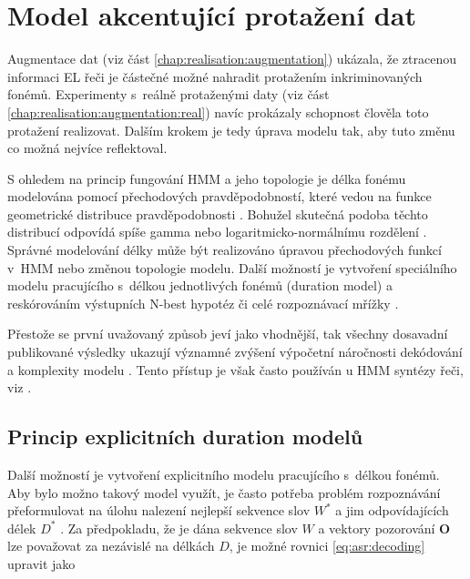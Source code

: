 \section{Model akcentující protažení dat}
\label{chap:realisation:durationmodels}

Augmentace dat (viz část \ref{chap:realisation:augmentation}) ukázala, že ztracenou informaci EL řeči je částečné možné nahradit protažením inkriminovaných fonémů.
Experimenty s~reálně protaženými daty (viz část \ref{chap:realisation:augmentation:real}) navíc prokázaly schopnost člověla toto protažení realizovat.
Dalším krokem je tedy úprava modelu tak, aby tuto změnu co možná nejvíce reflektoval.

S ohledem na princip fungování HMM a jeho topologie je délka fonému modelována pomocí přechodových pravděpodobností, které vedou na funkce geometrické distribuce pravděpodobnosti \cite{Rabiner1989}.
Bohužel skutečná podoba těchto distribucí odpovídá spíše gamma nebo logaritmicko-normálnímu rozdělení \cite{Alumae2014}.
Správné modelování délky může být realizováno úpravou přechodových funkcí v~HMM nebo změnou topologie modelu.
Další možností je vytvoření speciálního modelu pracujícího s~délkou jednotlivých fonémů (duration model) a reskórováním výstupních N-best hypotéz či celé rozpoznávací mřížky \cite{Alumae2014} \cite{Anastasakos1995}
\cite{Gadde2000}.

Přestože se první uvažovaný způsob jeví jako vhodnější, tak všechny dosavadní publikované výsledky ukazují významné zvýšení výpočetní náročnosti dekódování a komplexity modelu \cite{Rabiner1989} \cite{Pylkkonen2004} \cite{Russell1985}. Tento přístup je však často používán u HMM syntézy řeči, viz \cite{Yoshimura1998}.

\subsection{Princip explicitních duration modelů}
\label{chap:realisation:durationmodels:model}

Další možností je vytvoření explicitního modelu pracujícího s~délkou fonémů. Aby bylo možno takový model využít, je často potřeba problém rozpoznávání přeformulovat na úlohu nalezení nejlepší sekvence slov $W^{*}$ a jim odpovídajících délek $D^{*}$ \cite{Alumae2014}. Za předpokladu, že je dána sekvence slov $W$ a vektory pozorování $\boldsymbol{O}$ lze považovat za nezávislé na délkách $D$, je možné rovnici \ref{eq:asr:decoding} upravit jako

